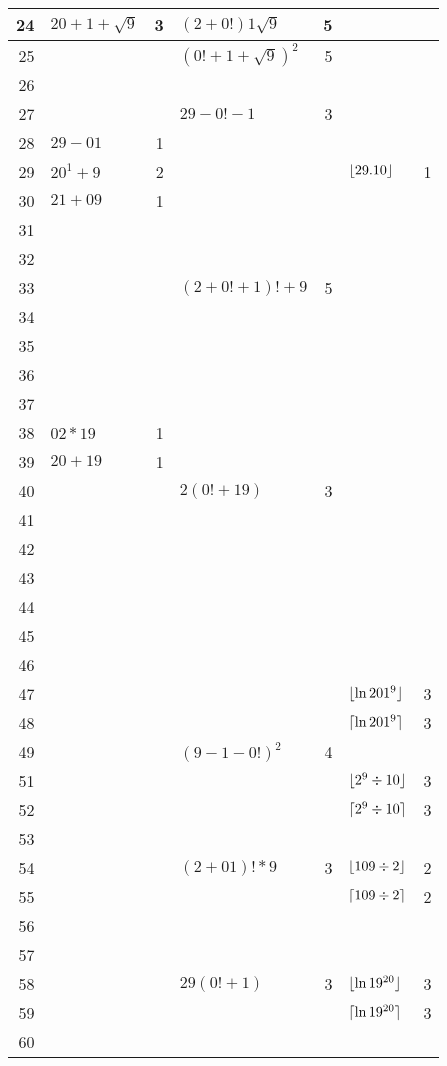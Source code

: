 \begin{longtable}{r l r l r l r}
24 & $20+1+\sqrt{9}$ & 3 & $(2+0!)1\sqrt{9}$ & 5 \\ \midrule
25 & & & ${(0!+1+\sqrt{9})}^{2}$ & 5 \\ \midrule
26 & & \\ \midrule
27 & & & $29-0!-1$ & 3 \\ \midrule
28 & $29-01$ & 1 \\ \midrule
29 & $20^1+9$ & 2 & & & $\lfloor29.10\rfloor$ & 1\\ \midrule
\midrule
30 & $21+09$ & 1 \\ \midrule
31 & & \\ \midrule
32 & & \\ \midrule
33 & & & $(2+0!+1)!+9$ & 5 \\ \midrule
34 & & \\ \midrule
35 & & \\ \midrule
36 & & \\ \midrule
37 & & \\ \midrule
38 & $02*19$ & 1 \\ \midrule
39 & $20+19$ & 1 \\ \midrule
\midrule
40 & & & $2(0!+19)$ & 3 \\ \midrule
41 & & \\ \midrule
42 & & \\ \midrule
43 & & \\ \midrule
44 & & \\ \midrule
45 & & \\ \midrule
46 & & \\ \midrule
47 & & & & & $\lfloor\ln 201^9\rfloor$ & 3 \\ \midrule
48 & & & & & $\lceil\ln 201^9\rceil$ & 3 \\ \midrule
49 & & & ${(9-1-0!)}^2$ & 4 \\ \midrule
\midrule
51 & & & & & $\lfloor2^9\div10\rfloor$ & 3 \\ \midrule
52 & & & & & $\lceil2^9\div10\rceil$ & 3 \\ \midrule
53 & & \\ \midrule
54 & & & $(2+01)!*9$ & 3 & $\lfloor109\div2\rfloor$ & 2 \\ \midrule
55 & & & & & $\lceil109\div2\rceil$ & 2 \\ \midrule
56 & & \\ \midrule
57 & & \\ \midrule
58 & & & $29(0!+1)$ & 3 & $\lfloor\ln 19^{20}\rfloor$ & 3 \\ \midrule
59 & & & & & $\lceil\ln 19^{20}\rceil$ & 3 \\ \midrule
\midrule
60 & & \\ \midrule

\end{longtable}
